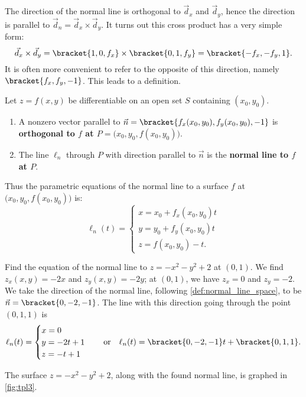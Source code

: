 The direction of the normal line is orthogonal to $\vec d_x$ and $\vec d_y$, hence the direction is parallel to $\vec d_n = \vec d_x\times \vec d_y$. It turns out this cross product has a very simple form:
\[ \vec d_x\times \vec d_y =\bracket{1,0,f_x}\times\bracket{0,1,f_y}=\bracket{-f_x,-f_y,1}.\]
It is often more convenient to refer to the opposite of this direction, namely $\bracket{f_x,f_y,-1}$. This leads to a definition.


\begin{definition}\label{def:normal_line_space}
Let $z=f(x,y)$ be differentiable on an open set $S$ containing $(x_0,y_0)$.

\begin{enumerate}
\item	A nonzero vector parallel to $\vec n=\bracket{f_x(x_0,y_0),f_y(x_0,y_0),-1}$ is \textbf{orthogonal to $f$ at $P=\bigl(x_0,y_0,f(x_0,y_0)\bigr)$}.

\item The line $\ell_n$ through $P$ with direction parallel to $\vec n$ is the \textbf{normal line to $f$ at $P$}.
\end{enumerate}
\end{definition}

Thus the parametric equations of the normal line to a surface $f$ at $\bigl(x_0,y_0,f(x_0,y_0)\bigr)$ is:
\[
\ell_{n}(t) =
\begin{cases}
x = x_0 + f_x(x_0,y_0)t \\
y = y_0 + f_y(x_0,y_0)t \\
z = f(x_0,y_0) - t.
\end{cases}
\]

\begin{example}\label{ex_tpl3}
Find the equation of the normal line to $z=-x^2-y^2+2$ at $(0,1)$.
\solution
We find $z_x(x,y) = -2x$ and $z_y(x,y) = -2y$; at $(0,1)$, we have $z_x = 0$ and $z_y = -2$. We take the direction of the normal line, following \autoref{def:normal_line_space}, to be $\vec n=\bracket{0,-2,-1}$. The line with this direction going through the point $(0,1,1)$ is 
%
%
\[
\ell_n(t) = \begin{cases}x=0\\y=-2t+1\\z=-t+1\end{cases}
\quad \text{or}\quad
\ell_n(t)=\bracket{0,-2,-1}t+\bracket{0,1,1}.
\]

The surface $z=-x^2-y^2+2$, along with the found normal line, is graphed in \autoref{fig:tpl3}.
\end{example}

